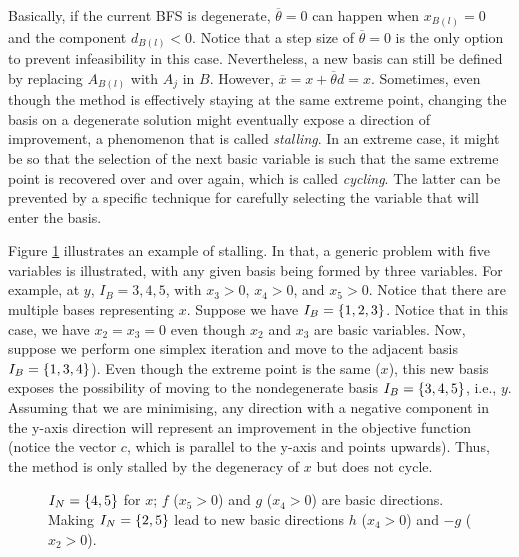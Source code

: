 Basically, if the current BFS is degenerate, $\overline{\theta} = 0$ can happen when $x_{B(l)} = 0$ and the component $d_{B(l)} < 0$. Notice that a step size of $\overline{\theta} = 0$ is the only option to prevent infeasibility in this case. Nevertheless, a new basis can still be defined by replacing $A_{B(l)}$ with $A_j$ in $B$. However, $\overline{x} = x + \overline{\theta}d = x$. Sometimes, even though the method is effectively staying at the same extreme point, changing the basis on a degenerate solution might eventually expose a direction of improvement, a phenomenon that is called \emph{stalling}. In an extreme case, it might be so that the selection of the next basic variable is such that the same extreme point is recovered over and over again, which is called \emph{cycling}. The latter can be prevented by a specific technique for carefully selecting the variable that will enter the basis. 

Figure \ref{p1c4:fig:degenerate_basis} illustrates an example of stalling. In that, a generic problem with five variables is illustrated, with any given basis being formed by three variables. For example, at $y$, $I_B = {3,4,5}$, with $x_3>0$, $x_4>0$, and $x_5 >0$. Notice that there are multiple bases representing $x$. Suppose we have $I_B = \left\{ 1,2,3 \right \}$. Notice that in this case, we have $x_2 = x_3 =0$ even though $x_2$ and $x_3$ are basic variables. Now, suppose we perform one simplex iteration and move to the adjacent basis $I_B = \left\{ 1,3,4 \right \}$). Even though the extreme point is the same ($x$), this new basis exposes the possibility of moving to the nondegenerate basis $I_B=\left\{ 3,4,5 \right \}$, i.e., $y$. Assuming that we are minimising, any direction with a negative component in the y-axis direction will represent an improvement in the objective function (notice the vector $c$, which is parallel to the y-axis and points upwards). Thus, the method is only stalled by the degeneracy of $x$ but does not cycle. 

\begin{figure}[h]
	\caption{ $I_N = \left\{ 4,5 \right \}$ for $x$; $f$ ($x_5 > 0$) and $g$ ($x_4 >0$) are basic directions. Making $I_N = \left\{ 2,5 \right \}$ lead to new basic directions $h$ ($x_4 > 0$) and $-g$ ($x_2 > 0$).} \label{p1c4:fig:degenerate_basis}
\end{figure}


